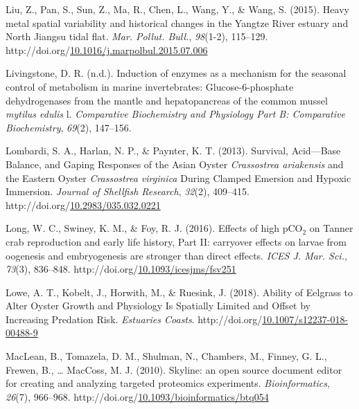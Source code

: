 \documentclass [11pt, proquest] {uwthesis}[2015/03/03]
\newlength{\cslhangindent}
\newenvironment{CSLReferences}%
{\setlength{\parindent}{0pt}%
\everypar{\setlength{\hangindent}{\cslhangindent}}\ignorespaces}%
{\par}
\begin{document}
\begin{CSLReferences}{1}{0}
\leavevmode\hypertarget{ref-Liu2015}{}%
Liu, Z., Pan, S., Sun, Z., Ma, R., Chen, L., Wang, Y., \& Wang, S. (2015). {Heavy metal spatial variability and historical changes in the Yangtze River estuary and North Jiangsu tidal flat}. \emph{Mar. Pollut. Bull.}, \emph{98}(1-2), 115--129. http://doi.org/\href{https://doi.org/10.1016/j.marpolbul.2015.07.006}{10.1016/j.marpolbul.2015.07.006}

\leavevmode\hypertarget{ref-Livingstone1981}{}%
Livingstone, D. R. (n.d.). Induction of enzymes as a mechanism for the seasonal control of metabolism in marine invertebrates: Glucose-6-phosphate dehydrogenases from the mantle and hepatopancreas of the common mussel \emph{mytilus edulis} l. \emph{Comparative Biochemistry and Physiology Part B: Comparative Biochemistry}, \emph{69}(2), 147--156.

\leavevmode\hypertarget{ref-Lombardi2013}{}%
Lombardi, S. A., Harlan, N. P., \& Paynter, K. T. (2013). {Survival, Acid---Base Balance, and Gaping Responses of the Asian Oyster \emph{Crassostrea ariakensis} and the Eastern Oyster \emph{Crassostrea virginica} During Clamped Emersion and Hypoxic Immersion}. \emph{Journal of Shellfish Research}, \emph{32}(2), 409--415. http://doi.org/\href{https://doi.org/10.2983/035.032.0221}{10.2983/035.032.0221}

\leavevmode\hypertarget{ref-Long2016}{}%
Long, W. C., Swiney, K. M., \& Foy, R. J. (2016). {Effects of high {pCO\(_2\)} on Tanner crab reproduction and early life history, Part II: carryover effects on larvae from oogenesis and embryogenesis are stronger than direct effects}. \emph{ICES J. Mar. Sci.}, \emph{73}(3), 836--848. http://doi.org/\href{https://doi.org/10.1093/icesjms/fsv251}{10.1093/icesjms/fsv251}

\leavevmode\hypertarget{ref-Lowe2018}{}%
Lowe, A. T., Kobelt, J., Horwith, M., \& Ruesink, J. (2018). {Ability of Eelgrass to Alter Oyster Growth and Physiology Is Spatially Limited and Offset by Increasing Predation Risk}. \emph{Estuaries Coasts}. http://doi.org/\href{https://doi.org/10.1007/s12237-018-00488-9}{10.1007/s12237-018-00488-9}

\leavevmode\hypertarget{ref-MacLean2010}{}%
MacLean, B., Tomazela, D. M., Shulman, N., Chambers, M., Finney, G. L., Frewen, B., \ldots{} MacCoss, M. J. (2010). {Skyline: an open source document editor for creating and analyzing targeted proteomics experiments}. \emph{Bioinformatics}, \emph{26}(7), 966--968. http://doi.org/\href{https://doi.org/10.1093/bioinformatics/btq054}{10.1093/bioinformatics/btq054}


\end{CSLReferences}
\end{document}

